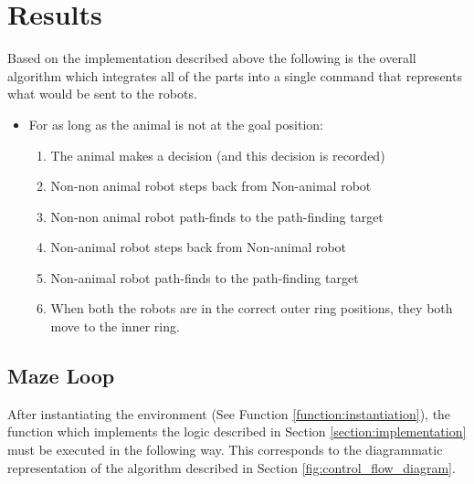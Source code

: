 \section{Results}

Based on the implementation described above the following is the overall algorithm which integrates all of the parts into a single command that represents what would be sent to the robots. 

\begin{tcolorbox}
\begin{itemize}
    \item[] For as long as the animal is not at the goal position:
\begin{enumerate}
    \item The animal makes a decision (and this decision is recorded)
    \item Non-non animal robot steps back from Non-animal robot
    \item Non-non animal robot path-finds to the path-finding target
    \item Non-animal robot steps back from Non-animal robot
    \item Non-animal robot path-finds to the path-finding target
    \item When both the robots are in the correct outer ring positions, they both move to the inner ring.
\end{enumerate}
\end{itemize}
\end{tcolorbox}
\subsection{Maze Loop}
\label{function:maze_loop}

After instantiating the environment (See Function \ref{function:instantiation}), the function which implements the logic described in Section \ref{section:implementation} must be executed in the following way. This corresponds to the diagrammatic representation of the algorithm described in Section \ref{fig:control_flow_diagram}. 


